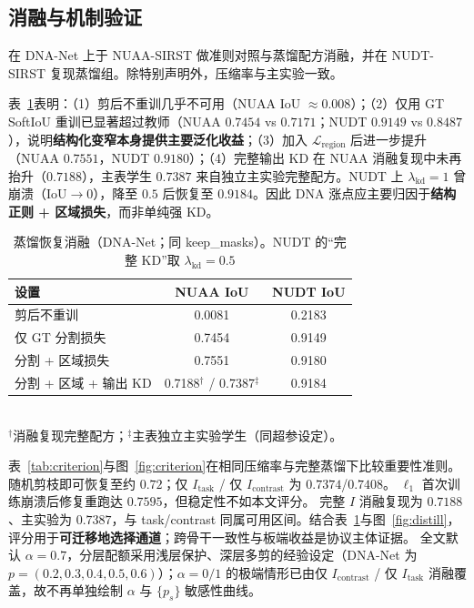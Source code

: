 \documentclass[lettersize,journal]{IEEEtran}
\begin{document}
\subsection{消融与机制验证}
\label{sec:ablation}

在 DNA-Net 上于 NUAA-SIRST 做准则对照与蒸馏配方消融，并在 NUDT-SIRST 复现蒸馏组。除特别声明外，压缩率与主实验一致。

表~\ref{tab:distill}表明：（1）剪后不重训几乎不可用（NUAA IoU $\approx 0.008$）；（2）仅用 GT SoftIoU 重训已显著超过教师（NUAA $0.7454$ vs $0.7171$；NUDT $0.9149$ vs $0.8487$），说明\textbf{结构化变窄本身提供主要泛化收益}；（3）加入 $\mathcal{L}_{\mathrm{region}}$ 后进一步提升（NUAA $0.7551$，NUDT $0.9180$）；（4）完整输出 KD 在 NUAA 消融复现中未再抬升（$0.7188$），主表学生 $0.7387$ 来自独立主实验完整配方。NUDT 上 $\lambda_{\mathrm{kd}}=1$ 曾崩溃（IoU$\to 0$），降至 $0.5$ 后恢复至 $0.9184$。因此 DNA 涨点应主要归因于\textbf{结构正则 + 区域损失}，而非单纯强 KD。

\begin{table}[!t]
\renewcommand{\arraystretch}{1.12}
\caption{蒸馏恢复消融（DNA-Net；同 keep\_masks）。NUDT 的“完整 KD”取 $\lambda_{\mathrm{kd}}=0.5$}
\label{tab:distill}
\centering
\begin{tabular}{@{}lcc@{}}
\toprule
设置 & NUAA IoU & NUDT IoU \\
\midrule
剪后不重训 & 0.0081 & 0.2183 \\
仅 GT 分割损失 & 0.7454 & 0.9149 \\
分割 + 区域损失 & 0.7551 & 0.9180 \\
分割 + 区域 + 输出 KD & 0.7188$^{\dagger}$ / 0.7387$^{\ddagger}$ & 0.9184 \\
\bottomrule
\end{tabular}\\[0.3em]
{\footnotesize $^{\dagger}$消融复现完整配方；$^{\ddagger}$主表独立主实验学生（同超参设定）。}
\end{table}

表~\ref{tab:criterion}与图~\ref{fig:criterion}在相同压缩率与完整蒸馏下比较重要性准则。随机剪枝即可恢复至约 $0.72$；仅 $I_{\mathrm{task}}$ / 仅 $I_{\mathrm{contrast}}$ 为 $0.7374$/$0.7408$。
$\ell_1$ 首次训练崩溃后修复重跑达 $0.7595$，但稳定性不如本文评分。
完整 $I$ 消融复现为 $0.7188$、主实验为 $0.7387$，与 task/contrast 同属可用区间。结合表~\ref{tab:distill}与图~\ref{fig:distill}，评分用于\textbf{可迁移地选择通道}；跨骨干一致性与板端收益是协议主体证据。
全文默认 $\alpha=0.7$，分层配额采用浅层保护、深层多剪的经验设定（DNA-Net 为 $p=(0.2,0.3,0.4,0.5,0.6)$）；$\alpha=0/1$ 的极端情形已由仅 $I_{\mathrm{contrast}}$ / 仅 $I_{\mathrm{task}}$ 消融覆盖，故不再单独绘制 $\alpha$ 与 $\{p_s\}$ 敏感性曲线。
\end{document}
